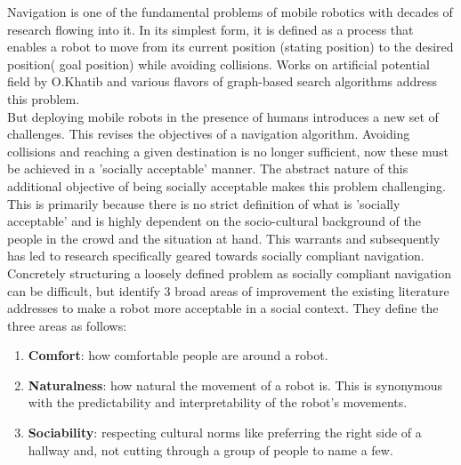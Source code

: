 Navigation is one of the fundamental problems of mobile robotics with decades of research flowing into it. In its simplest form, it is defined as a process that enables a robot to move from its current position (stating position) to the desired position( goal position) while avoiding collisions. Works on artificial potential field by O.Khatib \cite{khatib_1986} and various flavors of graph-based search algorithms address this problem.\\

But deploying mobile robots in the presence of humans introduces a new set of challenges. This revises the objectives of a navigation algorithm. Avoiding collisions and reaching a given destination is no longer sufficient, now these must be achieved in a 'socially acceptable' manner. The abstract nature of this additional objective of being socially acceptable makes this problem challenging. This is primarily because there is no strict definition of what is 'socially acceptable' and is highly dependent on the socio-cultural background of the people in the crowd and the situation at hand. This warrants and subsequently has led to research specifically geared towards socially compliant navigation.\\

Concretely structuring a loosely defined problem as socially compliant navigation can be difficult, but \cite{kruse_human-aware_2013} identify 3 broad areas of improvement the existing literature addresses to make a robot more acceptable in a social context. They define the three areas as follows:

\begin{enumerate}
    \item \textbf{Comfort}: how comfortable people are around a robot. 
    \item \textbf{Naturalness}: how natural the movement of a robot is. This is synonymous with the predictability and interpretability of the robot's movements.
    \item \textbf{Sociability}: respecting cultural norms like preferring the right side of a hallway and, not cutting through a group of people to name a few. %
\end{enumerate}

